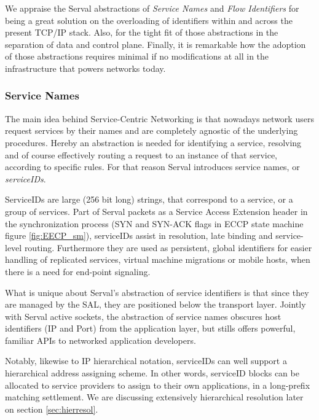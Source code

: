 We appraise the Serval abstractions of \emph{Service Names} and \emph{Flow Identifiers} for being a great solution on the overloading of identifiers within and across the present TCP/IP stack.
Also, for the tight fit of those abstractions in the separation of data and control plane.
Finally, it is remarkable how the adoption of those abstractions requires minimal if no modifications at all in the infrastructure that powers networks today.



\subsubsection{Service Names}
The main idea behind Service-Centric Networking is that nowadays network users request services by their names and are completely agnostic of the underlying procedures.
Hereby an abstraction is needed for identifying a service, resolving and of course effectively routing a request to an instance of that service, according to specific rules.
For that reason Serval introduces service names, or \emph{serviceIDs}.

ServiceIDs are large (256 bit long) strings, that correspond to a service, or a group of services.
Part of Serval packets as a Service Access Extension header in the synchronization process (SYN and SYN-ACK flags in ECCP state machine figure \ref{fig:EECP_sm}), serviceIDs assist in resolution, late binding and service-level routing.
Furthermore they are used as persistent, global identifiers for easier handling of replicated services, virtual machine migrations or mobile hosts, when there is a need for end-point signaling.

What is unique about Serval's abstraction of service identifiers is that since they are managed by the SAL, they are positioned below the transport layer.
Jointly with Serval active sockets, the abstraction of service names obscures host identifiers (IP and Port) from the application layer, but stills offers powerful, familiar APIs to networked application developers.

Notably, likewise to IP hierarchical notation, serviceIDs can well support a hierarchical address assigning scheme.
In other words, serviceID blocks can be allocated to service providers to assign to their own applications, in a long-prefix matching settlement.
We are discussing extensively hierarchical resolution later on section \ref{sec:hierresol}.

